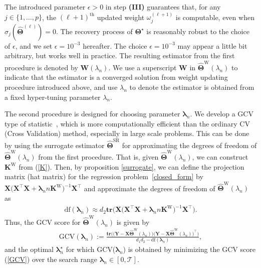 \documentclass[alpha-refs]{wiley-article}
\begin{document}
The introduced parameter $\epsilon>0$ in step {\bf(III)} guarantees that, for any $j\in\{1,\dots,p\}$,
the $(\ell+1)^{\text{th}}$ updated weight $\omega_{j}^{(\ell+1)}$ is computable, even when $\sigma_{j}(\widehat{\boldsymbol{\Theta}}^{(\ell)})=0$.
The recovery process of $\boldsymbol{\Theta}^{\star}$ is reasonably robust to the choice of $\epsilon$, and we set $\epsilon=10^{-3}$ hereafter.
The choice $\epsilon=10^{-3}$ may appear a little bit arbitrary, but works well in practice. The resulting estimator from the first procedure is denoted by $\boldsymbol{\text{W}}(\lambda_{n})$. We use a superscript $\boldsymbol{\text{W}}$ in $\widehat{\boldsymbol{\Theta}}^{\text{W}}(\lambda_{n})$ to indicate that the estimator is a converged solution from weight updating procedure introduced above, and use $\lambda_{n}$ to denote the estimator is obtained from a fixed hyper-tuning parameter  $\lambda_{n}$.

The second procedure is designed for choosing parameter $\boldsymbol{\lambda}_{n}$. We develop a GCV type of statistic~\citep{golub1979generalized}, which is more computationally efficient than the ordinary CV (Cross Validation) method, especially in large scale problems. This can be done by using the surrogate estimator $\widehat{\boldsymbol{\Theta}}^{\text{SR}}$ for approximating the degrees of freedom of $\widehat{\boldsymbol{\Theta}}^{\text{W}}(\lambda_{n})$ from the first procedure. That is, given $\widehat{\boldsymbol{\Theta}}^{\text{W}}(\lambda_{n})$, we can construct $\boldsymbol{K}^{\text{W}}$ from (\ref{K}).
Then, by proposition \ref{surrogate}, we can define the projection matrix (hat matrix) for the regression problem~\eqref{closed_form} by $\boldsymbol{X} \big(\boldsymbol{X}^{\top}\boldsymbol{X}+\boldsymbol{\lambda}_{n}n\boldsymbol{K}^{\text{W}}\big)^{-1}\boldsymbol{X}^{\top}$ and approximate the degrees of freedom of $\widehat{\boldsymbol{\Theta}}^{\text{W}}(\lambda_{n})$ as
\begin{align}
    \text{df}(\boldsymbol{\lambda}_{n}) \approx d_{2} \textbf{tr}\big(\boldsymbol{X} \big(\boldsymbol{X}^{\top}\boldsymbol{X}+\boldsymbol{\lambda}_{n}n\boldsymbol{K}^{\text{W}}\big)^{-1}\boldsymbol{X}^{\top}\big).
\end{align}
Thus, the GCV score for $\widehat{\boldsymbol{\Theta}}^{\text{W}}(\lambda_{n})$ is given by
\begin{align} \label{GCV}
    \text{GCV}(\boldsymbol{\lambda}_{n}) := \frac{\textbf{tr}\big(\big(\boldsymbol{Y}-\boldsymbol{X}\widehat{\boldsymbol{\Theta}}^{\text{W}}(\lambda_{n})\big)\big(\boldsymbol{Y}-\boldsymbol{X}\widehat{\boldsymbol{\Theta}}^{\text{W}}(\lambda_{n})\big)^{\top}\big)}{d_{1}d_{2}-\text{df}(\boldsymbol{\lambda}_{n})},
\end{align}
and the optimal $\boldsymbol{\lambda}_{n}^{\star}$ for which GCV($\boldsymbol{\lambda}_{n}$) is obtained by minimizing the GCV score (\ref{GCV}) over the search range $\boldsymbol{\lambda}_{n}\in [0,\mathcal{T}]$.
\end{document}
